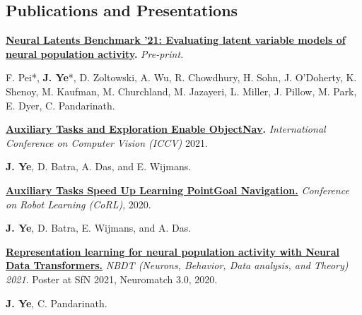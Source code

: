 \subsection*{Publications and Presentations}
    \textbf{\href{https://arxiv.org/abs/2109.04463}{Neural Latents Benchmark '21: Evaluating latent variable models of neural population activity}.}
    \textit{
    Pre-print.}

    \begin{addmargin}[1em]{0em}%
        F. Pei*, \textbf{J. Ye}*, D. Zoltowski, A. Wu, R. Chowdhury, H. Sohn, J. O'Doherty, K. Shenoy, M. Kaufman, M. Churchland, M. Jazayeri, L. Miller, J. Pillow, M. Park, E. Dyer, C. Pandarinath.
    \end{addmargin}

    \textbf{\href{https://joel99.github.io/objectnav/}{Auxiliary Tasks and Exploration Enable ObjectNav}.}
    \emph{International Conference on Computer Vision (ICCV)} 2021.

    \begin{addmargin}[1em]{0em}%
        \textbf{J. Ye}, D. Batra, A. Das, and E. Wijmans.
    \end{addmargin}

    \textbf{
        \href{https://arxiv.org/abs/2007.04561}
        {Auxiliary Tasks Speed Up Learning PointGoal Navigation.}
    } \emph{Conference on Robot Learning (CoRL)}, 2020.
    \begin{addmargin}[1em]{0em}%
        \textbf{J. Ye}, D. Batra, E. Wijmans, and A. Das.
    \end{addmargin}

    \textbf{\href{https://arxiv.org/abs/2108.01210}
    {Representation learning for neural population activity with Neural Data Transformers.}}
    \emph{NBDT (Neurons, Behavior, Data analysis, and Theory) 2021}. Poster at SfN 2021, Neuromatch 3.0, 2020.
    \begin{addmargin}[1em]{0em}
        \textbf{J. Ye}, C. Pandarinath.
    \end{addmargin}

